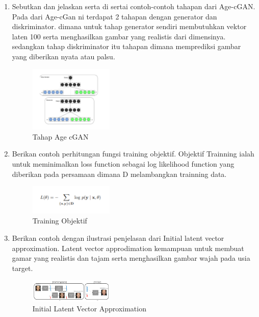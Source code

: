 \begin{enumerate}
 
        \item Sebutkan dan jelaskan serta di sertai contoh-contoh tahapan dari Age-cGAN.
		Pada dari Age-cGan ni terdapat 2 tahapan dengan generator dan diskriminator. dimana untuk tahap generator sendiri membutuhkan vektor laten 100 serta menghasilkan gambar yang realistis dari dimensinya. sedangkan tahap diskriminator itu tahapan dimana memprediksi gambar yang diberikan nyata atau palsu.
		\begin{figure}[H]
			\includegraphics[width=4cm]{figures/1174012/chapter9/teori8.PNG}
            	\centering
           	 \caption{Tahap Age cGAN}
       	\end{figure}

        \item Berikan contoh perhitungan fungsi training objektif.
		Objektif Trainning ialah untuk meminimalkan loss function sebagai log likelihood function yang diberikan pada persamaan dimana D melambangkan trainning data.
		\begin{figure}[H]
			\includegraphics[width=4cm]{figures/1174012/chapter9/teori9.PNG}
            	\centering
           	 \caption{Training Objektif}
       	\end{figure}

        \item Berikan contoh dengan ilustrasi penjelasan dari Initial latent vector approximation.
		Latent vector approdimation kemampuan untuk membuat gamar yang realistis dan tajam serta menghasilkan gambar wajah pada usia target.
		\begin{figure}[H]
			\includegraphics[width=4cm]{figures/1174012/chapter9/teori10.png}
            	\centering
           	 \caption{Initial Latent Vector Approximation}
       	\end{figure}


\end{enumerate}
